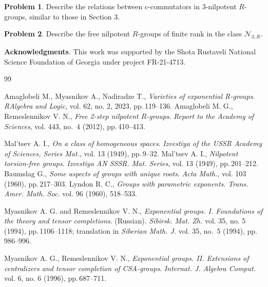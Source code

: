 \documentclass[11pt]{article}
\def\N{{\mathbb N}}
\def\N{{\mathcal{N}}}
\theoremstyle{definition}
\newtheorem{problem}{Problem}[section]
\begin{document}
\begin{problem}
Describe the relations between c-commutators in 3-nilpotent $R$-groups, similar to those in Section 3.
\end{problem}

\begin{problem}
Describe the free nilpotent $R$-groups of finite rank in the class $\N_{3,R}$.
\end{problem}

\textbf{Acknowledgments}. This work was supported by the Shota Rustaveli National Science Foundation of Georgia under project FR-21-4713.


\begin{thebibliography}{99}

	Amaglobeli M., Myasnikov A., Nadiradze T., {\it Varieties of exponential R-groups}. \emph{RAlgebra and Logic}, vol. 62, no. 2, 2023, pp.\,119--136.
Amaglobeli M. G., Remeslennikov V. N., {\it Free 2-step nilpotent $R$-groups}. \emph{Report to the Academy of Sciences}, vol. 443, no.~4 (2012), pp.\,410--413.



	Mal'tsev A. I., {\it On a class of homogeneous spaces}. \emph{Izvestiya of the USSR Academy of Sciences, Series Mat.}, vol. 13 (1949), pp.\,9--32.
	Mal'tsev A. I., {\it Nilpotent torsion-free groups}. \emph{Izvestiya AN SSSR. Mat. Series}, vol. 13 (1949), pp.\,201--212.
	Baumslag G., {\it Some aspects of groups with unique roots}. \emph{Acta Math.}, vol. 103 (1960), pp.\,217--303.
Lyndon R. C., {\it Groups with parametric exponents}. \emph{Trans. Amer. Math. Soc.} vol. 96 (1960), 518--533.

Myasnikov A. G. and Remeslennikov V. N., {\it Exponential groups. I. Foundations of the theory and tensor completions}. (Russian). \emph{Sibirsk. Mat. Zh.} vol. 35, no. 5 (1994), pp.\,1106--1118; translation in \emph{Siberian Math. J.} vol. 35, no.~5 (1994), pp.\,986--996.

Myasnikov A. G., Remeslennikov V. N., {\it Exponential groups. II. Ex\-ten\-sions of centralizers and tensor completion of CSA-groups}. \emph{Internat. J. Algebra Comput.} vol. 6, no. 6 (1996), pp.\,687--711.


\end{thebibliography}
\end{document}
